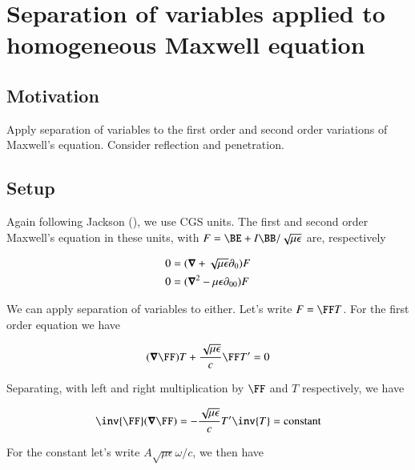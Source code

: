 %

\chapter{Separation of variables applied to homogeneous Maxwell equation}
\label{chap:maxwellSepVars}
{}
\date{Aug 9, 2009}

\beginArtWithToc

\section{Motivation}

Apply separation of variables to the first order and second order variations of Maxwell's equation.  Consider reflection and penetration.

\section{Setup}

Again following Jackson (\cite{jackson1975cew}), we use CGS units.  The first and second order Maxwell's equation in these units, with $F = \BE + I\BB/\sqrt{\mu\epsilon}$ are, respectively

\begin{align}\label{eqn:foo1}
0 &= (\boldsymbol{\nabla} + \sqrt{\mu\epsilon} \partial_0) F \\
0 &= (\boldsymbol{\nabla}^2 - {\mu\epsilon} \partial_{00}) F 
\end{align}

We can apply separation of variables to either.  Let's write $F = \FF T$.  For the first order equation we have

\begin{align*}
(\spacegrad \FF) T + \frac{\sqrt{\mu\epsilon}}{c} \FF T' = 0
\end{align*}

Separating, with left and right multiplication by $\FF$ and $T$ respectively, we have

\begin{align}\label{eqn:foo2}
\inv{\FF} (\spacegrad \FF) = -\frac{\sqrt{\mu\epsilon}}{c} T' \inv{T} = \text{constant}
\end{align}

For the constant let's write $A \sqrt{\mu\epsilon} \omega/c$, we then have

